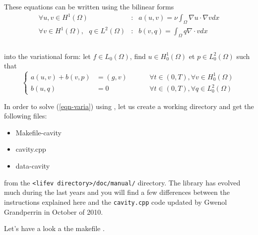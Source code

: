 These equations can be written using the bilinear forms
\begin{eqnarray*}
\displaystyle \forall u,v \in H^1(\Omega) & : &
a(u,v) = \nu \int_{\Omega}\nabla u \cdot \nabla v dx \\
\displaystyle \forall v \in H^1(\Omega),\mbox{ } q \in L^2(\Omega) & : &
b(v,q) = \int_{\Omega} q\nabla \cdot v dx \\
\end{eqnarray*}\\
into the variational form: let $f
\in L_0(\Omega)$, find $u \in H^1_0(\Omega)$ et $p \in
L^2_0(\Omega)$ such that
\begin{equation} \label{eqn-varia}
\left\{
\begin{array}{rlr}
\displaystyle a(u,v) + b(v,p) & =  (g,v)
& \hspace{1cm} \forall t \in(0,T), \forall v \in H^1_0(\Omega) \\
b(u,q) & = 0 & \hspace{1cm} \forall t \in (0,T), \forall q \in L^2_0(\Omega)
\end{array}
\right.
\end{equation}

In order to solve (\ref{eqn-varia}) using \lifev, let us create a working directory
and get the following files:

\begin{itemize}
\item Makefile-cavity
\item cavity.cpp
\item data-cavity
\end{itemize}

from the \verb|<lifev directory>/doc/manual/| directory. The library has evolved 
much during the last years and you will find a few differences between the 
instructions explained here and the \verb!cavity.cpp! code updated by 
Gwenol Grandperrin in October of 2010. 


Let's have a look a the makefile .

